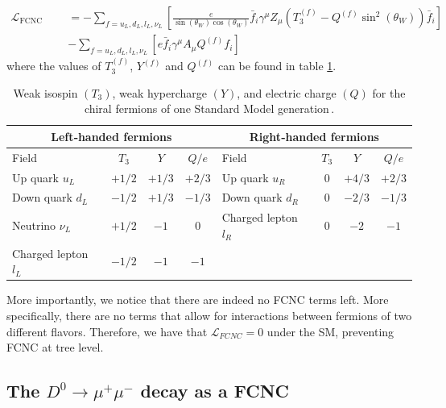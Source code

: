 \begin{equation}
\begin{split}
\mathcal{L}_{\text{FCNC Candidates}} &= -\sum_{f = u_{L},d_{L},l_{L}, \nu_{L}} \left[\frac{e}{\sin(\theta_{W})\cos(\theta_{W})} \bar{f}_{i}\gamma^\mu Z_{\mu}\left(T_{3}^{(f)} -Q^{(f)}\sin^2(\theta_{W})\right)\bar{f}_{i}\right]\\
&- \sum_{f = u_{L},d_{L},l_{L}, \nu_{L}} \left[ e \bar{f}_{i}\gamma^\mu A_{\mu}Q^{(f)}f_{i}\right]
\end{split}
\end{equation}
where the values of $T_3^{(f)}$, $Y^{(f)}$ and $Q^{(f)}$ can be found in table \ref{tab:ew_charges}. 


\begin{table}[htbp]
    \centering
    \begin{tabular}{|lccc|lccc|}
      \hline
      \multicolumn{4}{|c|}{\textbf{Left‑handed fermions}} &
      \multicolumn{4}{c|}{\textbf{Right‑handed fermions}} \\
      \hline
      Field & $T_3$ & $Y$ & $Q/e$ &
      Field & $T_3$ & $Y$ & $Q/e$ \\
      \hline
      Up quark $u_L$        & $+1/2$ & $+1/3$ & $+2/3$ &
      Up quark $u_R$        & $0$    & $+4/3$ & $+2/3$ \\
      Down quark $d_L$      & $-1/2$ & $+1/3$ & $-1/3$ &
      Down quark $d_R$      & $0$    & $-2/3$ & $-1/3$ \\
      Neutrino $\nu_L$      & $+1/2$ & $-1$   & $0$    &
      Charged lepton $l_R$  & $0$    & $-2$   & $-1$   \\
      Charged lepton $l_L$  & $-1/2$ & $-1$   & $-1$   &
                            &        &        &        \\
      \hline
    \end{tabular}
    \caption{Weak isospin $(T_3)$, weak hypercharge $(Y)$, and electric
             charge $(Q)$ for the chiral fermions of one Standard Model
             generation\,\cite{ref:pdg2024}.}
    \label{tab:ew_charges}
  \end{table}
  
  

More importantly, we notice that there are indeed no FCNC terms left. More specifically, there are no terms that allow for interactions between fermions of two different flavors. Therefore, we have that $\mathcal{L}_{FCNC} = 0$ under the SM, preventing FCNC at tree level. 

\subsection{The $D^0 \to \mu^+ \mu^-$ decay as a FCNC}

